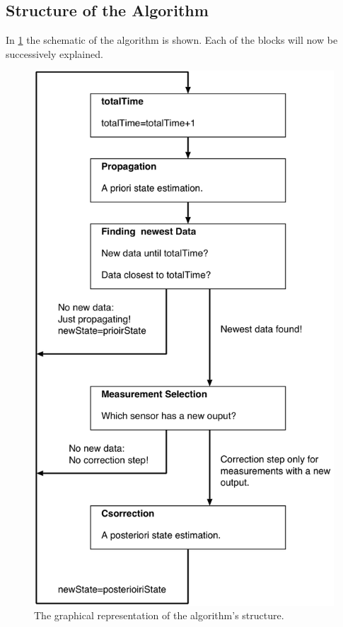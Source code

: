 \subsection*{Structure of the Algorithm}
In \ref{structure_algo} the schematic of the algorithm is shown. Each of the blocks will now be successively explained.
\begin{figure}
\begin{center}
\includegraphics[width=8 cm]{pictures/structure_algo_2.png}
\caption{The graphical representation of the algorithm's structure.}
\label{structure_algo}
\end{center}
\end{figure}


